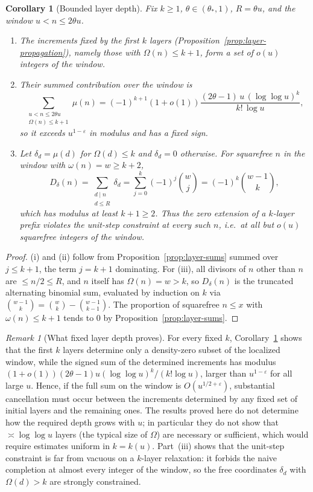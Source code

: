 \documentclass[11pt]{amsart}
\numberwithin{equation}{section}
\theoremstyle{plain}
\newtheorem{corollary}[theorem]{Corollary}
\theoremstyle{definition}
\theoremstyle{remark}
\newtheorem{remark}[theorem]{Remark}
\newcommand{\eps}{\varepsilon}
\begin{document}
\begin{corollary}[Bounded layer depth]
\label{cor:bounded-depth}
Fix $k\ge1$, $\theta\in(\theta_*,1)$, $R=\theta u$, and the window
$u<n\le2\theta u$.
\begin{enumerate}[label=\textup{(\roman*)}]
\item The increments fixed by the first $k$ layers
(Proposition~\ref{prop:layer-propagation}), namely those with
$\Omega(n)\le k+1$, form a set of $o(u)$ integers of the window.
\item Their summed contribution over the window is
\[
\sum_{\substack{u<n\le2\theta u\\ \Omega(n)\le k+1}}\mu(n)
=(-1)^{k+1}(1+o(1))\frac{(2\theta-1)\,u\,(\log\log u)^{k}}{k!\,\log u},
\]
so it exceeds $u^{1-\eps}$ in modulus and has a fixed sign.
\item Let $\delta_d=\mu(d)$ for $\Omega(d)\le k$ and $\delta_d=0$ otherwise.
For squarefree $n$ in the window with $\omega(n)=w\ge k+2$,
\[
D_\delta(n)=\sum_{\substack{d\mid n\\ d\le R}}\delta_d
=\sum_{j=0}^{k}(-1)^j\binom wj=(-1)^k\binom{w-1}{k},
\]
which has modulus at least $k+1\ge2$. Thus the zero extension of a
$k$-layer prefix violates the unit-step constraint at every such $n$, i.e.\
at all but $o(u)$ squarefree integers of the window.
\end{enumerate}
\end{corollary}

\begin{proof}
(i) and (ii) follow from Proposition~\ref{prop:layer-sums} summed over
$j\le k+1$, the term $j=k+1$ dominating. For (iii), all divisors of $n$
other than $n$ are $\le n/2\le R$, and $n$ itself has $\Omega(n)=w>k$, so
$D_\delta(n)$ is the truncated alternating binomial sum, evaluated by
induction on $k$ via $\binom{w-1}{k}=\binom wk-\binom{w-1}{k-1}$. The
proportion of squarefree $n\le x$ with $\omega(n)\le k+1$ tends to $0$ by
Proposition~\ref{prop:layer-sums}.
\end{proof}

\begin{remark}[What fixed layer depth proves]
\label{rem:depth-content}
For every fixed $k$, Corollary~\ref{cor:bounded-depth} shows that the first
$k$ layers determine only a density-zero subset of the localized window,
while the signed sum of the determined increments has modulus
$(1+o(1))(2\theta-1)u(\log\log u)^k/(k!\log u)$, larger than $u^{1-\eps}$
for all large $u$. Hence, if the full sum on the window is
$O(u^{1/2+\eps})$, substantial cancellation must occur between the
increments determined by any fixed set of initial layers and the remaining
ones. The results proved here do not determine how the required depth grows
with $u$; in particular they do not show that $\asymp\log\log u$ layers
(the typical size of $\Omega$) are necessary or sufficient, which would
require estimates uniform in $k=k(u)$. Part~(iii) shows that the unit-step
constraint is far from vacuous on a $k$-layer relaxation: it forbids the
naive completion at almost every integer of the window, so the free
coordinates $\delta_d$ with $\Omega(d)>k$ are strongly constrained.
\end{remark}
\end{document}
